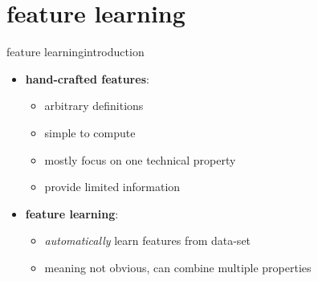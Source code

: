     \section[learned]{feature learning}
        \begin{frame}{feature learning}{introduction}
            \begin{itemize}
                \item   \textbf{hand-crafted features}:
                    \begin{itemize}
                        \item   arbitrary definitions
                        \item   simple to compute
                        \item   mostly focus on one technical property
                        \item   provide limited information
                    \end{itemize}
                    
                \bigskip
                \item<2-> \textbf{feature learning}:
                    \begin{itemize}
                        \item   \textit{automatically} learn features from data-set
                        \item   meaning not obvious, can combine multiple properties
                        
                    \end{itemize}
            \end{itemize}
		\end{frame}
